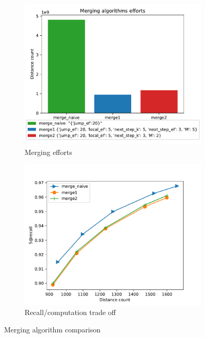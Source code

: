\documentclass{article}
\begin{document}
\begin{figure}
\begin{subfigure}{.5\textwidth}
  \centering
  \includegraphics[width=1.\linewidth]{figs/merge-effort-comparison.pdf}
  \caption{Merging efforts}
  \label{fig:sfig1}
\end{subfigure}%
\begin{subfigure}{.5\textwidth}
  \centering
  \includegraphics[width=1.\linewidth]{figs/recall-comparsion.pdf}
  \caption{Recall/computation trade off}
  \label{fig:sfig2}
\end{subfigure}
\caption{Merging algorithm comparison}
\label{fig:fig}
\end{figure}






\end{document}
